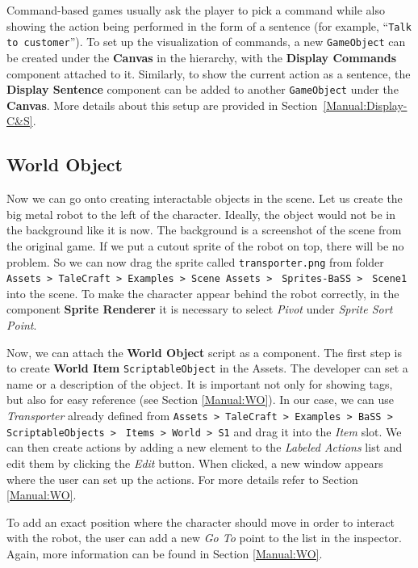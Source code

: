 Command-based games usually ask the player to pick a command while also showing the action being performed in the form of a sentence (for example, “\verb|Talk to customer|”). To set up the visualization of commands, a new \verb|GameObject| can be created under the \textbf{Canvas} in the hierarchy, with the \textbf{Display Commands} component attached to it. Similarly, to show the current action as a sentence, the \textbf{Display Sentence} component can be added to another \verb|GameObject| under the \textbf{Canvas}. More details about this setup are provided in Section~\ref{Manual:Display-C&S}.

\subsection{World Object}
Now we can go onto creating interactable objects in the scene. Let us create the big metal robot to the left of the character. Ideally, the object would not be in the background like it is now. The background is a screenshot of the scene from the original game. If we put a cutout sprite of the robot on top, there will be no problem. So we can now drag the sprite called \verb|transporter.png| from folder \verb|Assets > TaleCraft > Examples > Scene Assets > | \verb|Sprites-BaSS > | \verb|Scene1| into the scene. To make the character appear behind the robot correctly, in the component \textbf{Sprite Renderer} it is necessary to select \textit{Pivot} under \textit{Sprite Sort Point}. 

Now, we can attach the \textbf{World Object} script as a component. The first step is to create \textbf{World Item} \verb|ScriptableObject| in the Assets. The developer can set a name or a description of the object. It is important not only for showing tags, but also for easy reference (see Section \ref{Manual:WO}). In our case, we can use \textit{Transporter} already defined from \verb|Assets > TaleCraft > Examples > BaSS > | \verb|ScriptableObjects > | \verb|Items > World > S1| and drag it into the \textit{Item} slot. We can then create actions by adding a new element to the \textit{Labeled Actions} list and edit them by clicking the \textit{Edit} button. When clicked, a new window appears where the user can set up the actions. For more details refer to Section \ref{Manual:WO}.

To add an exact position where the character should move in order to interact with the robot, the user can add a new \textit{Go To} point to the list in the inspector. Again, more information can be found in Section \ref{Manual:WO}. 

